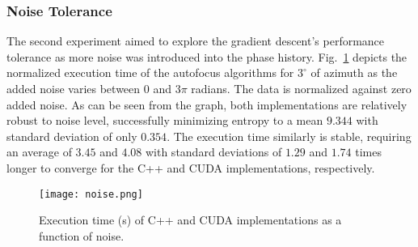 \subsubsection{Noise Tolerance}

The second experiment aimed to explore the gradient descent's performance
tolerance as more noise was introduced into the phase history.
Fig.~\ref{fig:noise} depicts the normalized execution time of the
autofocus algorithms for $3^{\circ}$ of azimuth as the added noise varies
between $0$ and $3\pi$ radians. The data is normalized against zero added noise.
As can be seen from the graph, both implementations are relatively robust to
noise level, successfully minimizing entropy to a mean $9.344$ with standard
deviation of only $0.354$. The execution time similarly is stable, requiring an
average of $3.45$ and $4.08$ with standard deviations of $1.29$ and $1.74$ times
longer to converge for the C++ and CUDA implementations, respectively.

\begin{figure}
  \centering
  \texttt{[image: noise.png]}
  \vspace{5 mm}
  \caption{Execution time (s) of C++ and CUDA implementations as a function of
  noise.}
  \label{fig:noise}
\end{figure}
